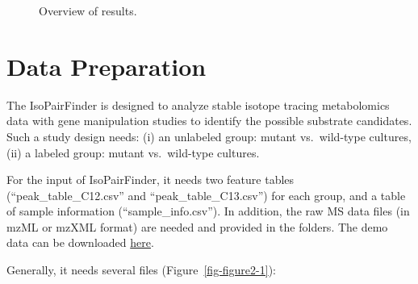 \documentclass[
  letterpaper,
  DIV=11,
  numbers=noendperiod]{scrreprt}
\begin{document}
\begin{figure}


\caption{\label{fig-figure1-2}Overview of results.}

\end{figure}%


\chapter{Data Preparation}\label{sec-data-preparation}

The IsoPairFinder is designed to analyze stable isotope tracing
metabolomics data with gene manipulation studies to identify the
possible substrate candidates. Such a study design needs: (i) an
unlabeled group: mutant vs.~wild-type cultures, (ii) a labeled group:
mutant vs.~wild-type cultures.

For the input of IsoPairFinder, it needs two feature tables
(``peak\_table\_C12.csv'' and ``peak\_table\_C13.csv'') for each group,
and a table of sample information (``sample\_info.csv''). In addition,
the raw MS data files (in mzML or mzXML format) are needed and provided
in the folders. The demo data can be downloaded
\href{https://github.com/DoddLab/IsoPairFinder_demo_data}{here}.

Generally, it needs several files (Figure~\ref{fig-figure2-1}):
\end{document}
